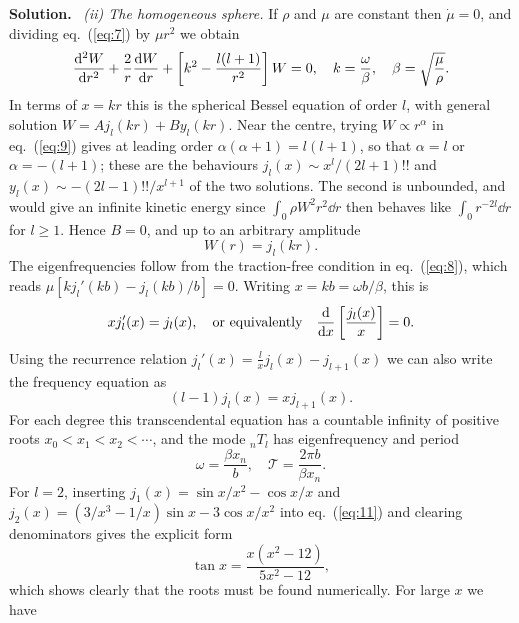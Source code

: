 \documentclass[a4paper,12pt]{paper}
\newenvironment{solution}{\par\noindent\textbf{Solution.}\ }{\par\medskip}
\begin{document}
\begin{solution}
\medskip
\noindent\textit{(ii) The homogeneous sphere.}
If $\rho$ and $\mu$ are constant then $\dot{\mu}=0$, and dividing eq.~(\ref{eq:7}) by
$\mu r^{2}$ we obtain
\begin{equation}
\frac{\mathrm{d}^{2}W}{\mathrm{d} r^{2}}+\frac{2}{r}\frac{\mathrm{d} W}{\mathrm{d} r}
+\left[k^{2}-\frac{l(l+1)}{r^{2}}\right]W=0,\quad k=\frac{\omega}{\beta},
\quad \beta=\sqrt{\frac{\mu}{\rho}}.
\label{eq:9}
\end{equation}
In terms of $x=kr$ this is the spherical Bessel equation of order $l$, with general solution
$W=Aj_{l}(kr)+By_{l}(kr)$. Near the centre, trying $W\propto r^{\alpha}$ in eq.~(\ref{eq:9})
gives at leading order $\alpha(\alpha+1)=l(l+1)$, so that $\alpha=l$ or $\alpha=-(l+1)$; these
are the behaviours $j_{l}(x)\sim x^{l}/(2l+1)!!$ and $y_{l}(x)\sim-(2l-1)!!/x^{l+1}$ of the
two solutions. The second is unbounded, and would give an infinite kinetic energy since
$\int_{0}\rho W^{2}r^{2}\dd r$ then behaves like $\int_{0}r^{-2l}\dd r$ for $l\ge1$. Hence
$B=0$, and up to an arbitrary amplitude
\begin{equation}
W(r)=j_{l}(kr).
\label{eq:10}
\end{equation}
The eigenfrequencies follow from the traction-free condition in eq.~(\ref{eq:8}), which reads
$\mu[kj_{l}'(kb)-j_{l}(kb)/b]=0$. Writing $x=kb=\omega b/\beta$, this is
\begin{equation}
xj_{l}'(x)=j_{l}(x),\quad\text{or equivalently}\quad
\frac{\mathrm{d}}{\mathrm{d} x}\left[\frac{j_{l}(x)}{x}\right]=0 .
\label{eq:11}
\end{equation}
Using the recurrence relation $j_{l}'(x)=\frac{l}{x}j_{l}(x)-j_{l+1}(x)$ we can also write the
frequency equation as
\begin{equation}
(l-1)j_{l}(x)=xj_{l+1}(x).
\label{eq:12}
\end{equation}
For each degree this transcendental equation has a countable infinity of positive roots
$x_{0}<x_{1}<x_{2}<\cdots$, and the mode ${}_{n}T_{l}$ has eigenfrequency and period
\begin{equation}
\omega=\frac{\beta x_{n}}{b},\quad \mathcal{T}=\frac{2\pi b}{\beta x_{n}}.
\label{eq:13}
\end{equation}
For $l=2$, inserting $j_{1}(x)=\sin x/x^{2}-\cos x/x$ and
$j_{2}(x)=(3/x^{3}-1/x)\sin x-3\cos x/x^{2}$ into eq.~(\ref{eq:11}) and clearing
denominators gives the explicit form
\begin{equation}
\tan x=\frac{x(x^{2}-12)}{5x^{2}-12},
\label{eq:14}
\end{equation}
which shows clearly that the roots must be found numerically. For large $x$ we have

\end{solution}
\end{document}
